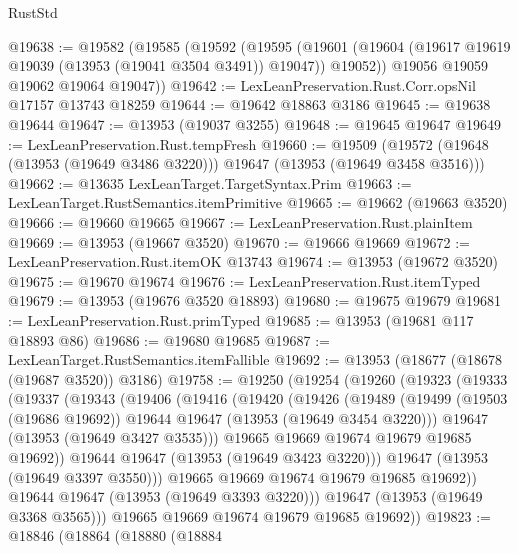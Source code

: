 \begin{lexlean}{RustStd}
\begin{coremodule}
@19638 := @19582
    (@19585
      (@19592
        (@19595
          (@19601 (@19604 (@19617 @19619 @19039 (@13953 (@19041 @3504 @3491)) @19047)) @19052))
        @19056
        @19059
        @19062
        @19064
        @19047))
@19642 := LexLeanPreservation.Rust.Corr.opsNil @17157 @13743 @18259
@19644 := @19642 @18863 @3186
@19645 := @19638 @19644
@19647 := @13953 (@19037 @3255)
@19648 := @19645 @19647
@19649 := LexLeanPreservation.Rust.tempFresh
@19660 := @19509
    (@19572 (@19648 (@13953 (@19649 @3486 @3220))) @19647 (@13953 (@19649 @3458 @3516)))
@19662 := @13635 LexLeanTarget.TargetSyntax.Prim
@19663 := LexLeanTarget.RustSemantics.itemPrimitive
@19665 := @19662 (@19663 @3520)
@19666 := @19660 @19665
@19667 := LexLeanPreservation.Rust.plainItem
@19669 := @13953 (@19667 @3520)
@19670 := @19666 @19669
@19672 := LexLeanPreservation.Rust.itemOK @13743
@19674 := @13953 (@19672 @3520)
@19675 := @19670 @19674
@19676 := LexLeanPreservation.Rust.itemTyped
@19679 := @13953 (@19676 @3520 @18893)
@19680 := @19675 @19679
@19681 := LexLeanPreservation.Rust.primTyped
@19685 := @13953 (@19681 @117 @18893 @86)
@19686 := @19680 @19685
@19687 := LexLeanTarget.RustSemantics.itemFallible
@19692 := @13953 (@18677 (@18678 (@19687 @3520)) @3186)
@19758 := @19250
    (@19254
      (@19260
        (@19323
          (@19333
            (@19337
              (@19343
                (@19406
                  (@19416
                    (@19420
                      (@19426
                        (@19489
                          (@19499
                            (@19503 (@19686 @19692))
                            @19644
                            @19647
                            (@13953 (@19649 @3454 @3220)))
                          @19647
                          (@13953 (@19649 @3427 @3535)))
                        @19665
                        @19669
                        @19674
                        @19679
                        @19685
                        @19692))
                    @19644
                    @19647
                    (@13953 (@19649 @3423 @3220)))
                  @19647
                  (@13953 (@19649 @3397 @3550)))
                @19665
                @19669
                @19674
                @19679
                @19685
                @19692))
            @19644
            @19647
            (@13953 (@19649 @3393 @3220)))
          @19647
          (@13953 (@19649 @3368 @3565)))
        @19665
        @19669
        @19674
        @19679
        @19685
        @19692))
@19823 := @18846
    (@18864
      (@18880
        (@18884

\end{coremodule}
\end{lexlean}
